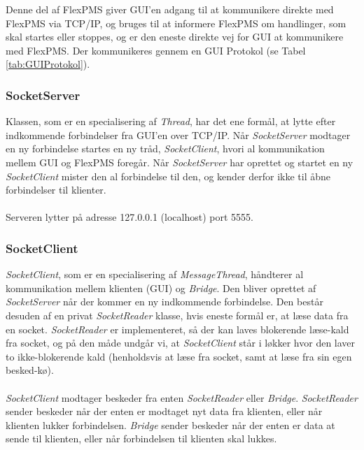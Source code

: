 Denne del af FlexPMS giver GUI'en adgang til at kommunikere direkte med FlexPMS via TCP/IP, og bruges til at informere FlexPMS om handlinger, som skal startes eller stoppes, og er den eneste direkte vej for GUI at kommunikere med FlexPMS. Der kommunikeres gennem en GUI Protokol (se Tabel \ref{tab:GUIProtokol}).




\subsubsection{SocketServer}
Klassen, som er en specialisering af \textit{Thread}, har det ene formål, at lytte efter indkommende forbindelser fra GUI’en over TCP/IP. Når \textit{SocketServer} modtager en ny forbindelse startes en ny tråd, \textit{SocketClient}, hvori al kommunikation mellem GUI og FlexPMS foregår. Når \textit{SocketServer} har oprettet og startet en ny \textit{SocketClient} mister den al forbindelse til den, og kender derfor ikke til åbne forbindelser til klienter.\\\\

Serveren lytter på adresse 127.0.0.1 (localhost) port 5555.



\subsubsection{SocketClient}

\textit{SocketClient}, som er en specialisering af \textit{MessageThread}, håndterer al kommunikation mellem klienten (GUI) og \textit{Bridge}. Den bliver oprettet af \textit{SocketServer} når der kommer en ny indkommende forbindelse. Den består desuden af en privat \textit{SocketReader} klasse, hvis eneste formål er, at læse data fra en socket. \textit{SocketReader} er implementeret, så der kan laves blokerende læse-kald fra socket, og på den måde undgår vi, at \textit{SocketClient} står i løkker hvor den laver to ikke-blokerende kald (henholdsvis at læse fra socket, samt at læse fra sin egen besked-kø).\\\\

\textit{SocketClient} modtager beskeder fra enten \textit{SocketReader} eller \textit{Bridge}. \textit{SocketReader} sender beskeder når der enten er modtaget nyt data fra klienten, eller når klienten lukker forbindelsen. \textit{Bridge} sender beskeder når der enten er data at sende til klienten, eller når forbindelsen til klienten skal lukkes.\\\\


